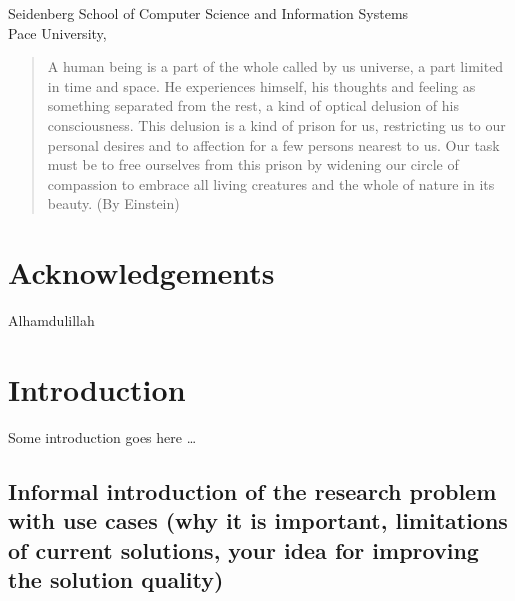 \documentclass[]{article}
\begin{document}
\vspace{4.5cm}  %

\begin{flushleft}
Seidenberg School of Computer Science and Information Systems
\\
Pace University, \date{February 2019}
\end{flushleft}





\newpage
\thispagestyle{empty}
{ %

\begin{abstract}
\large
A human being is a part of the whole called by us universe, a part
limited in time and space. He experiences himself, his thoughts and
feeling as something separated from the rest, a kind of optical delusion
of his consciousness. This delusion is a kind of prison for us,
restricting us to our personal desires and to affection for a few
persons nearest to us. Our task must be to free ourselves from this
prison by widening our circle of compassion to embrace all living
creatures and the whole of nature in its beauty. (By Einstein)
\end{abstract}

}
\newpage

{
\newpage
\thispagestyle{empty}
\setcounter{tocdepth}{3}
\tableofcontents
\newpage

\setcounter{page}{0}

}

\thispagestyle{empty} \section*{\centering Acknowledgements}

\begin{center}
Alhamdulillah
\end{center}

\doublespacing

\section{Introduction}\label{introduction}

Some introduction goes here \ldots{}

\subsection{Informal introduction of the research problem with use cases
(why it is important, limitations of current solutions, your idea for
improving the solution
quality)}\label{informal-introduction-of-the-research-problem-with-use-cases-why-it-is-important-limitations-of-current-solutions-your-idea-for-improving-the-solution-quality}
\end{document}
